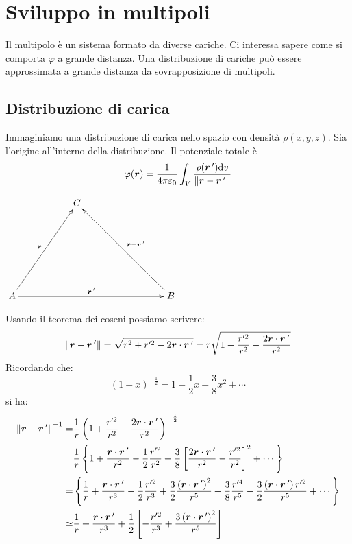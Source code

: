 \section{Sviluppo in multipoli}
Il multipolo è un sistema formato da diverse cariche. Ci interessa sapere come si comporta $\varphi$ a grande distanza. Una distribuzione di cariche può essere approssimata a grande distanza da sovrapposizione di multipoli.
\subsection{Distribuzione di carica}
Immaginiamo una distribuzione di carica nello spazio con densità $\rho(x,y,z)$. Sia l'origine all'interno della distribuzione. Il potenziale totale è 
\begin{equation}
\varphi(\boldsymbol{r})=\frac{1}{4\pi\varepsilon_0}\int_V\frac{\rho(\boldsymbol{r}\,')\mathrm{d} v}{\left\lVert\boldsymbol{r}-\boldsymbol{r}\,'\right\rVert}
\label{multipolo_01}
\end{equation}
\begin{center}
$
\xymatrix{
&&C&&&\\
\\
\\
A\ar[rruuu]^{\ve r}\ar[rrrrr]^{\ve r\,'}&&&&&B\ar[llluuu]_{\ve r-\ve r\,'}
}$\end{center}
Usando il teorema dei coseni possiamo scrivere:
\begin{equation*}\left\lVert\boldsymbol{r}-\boldsymbol{r}\,'\right\rVert=\sqrt{r^2+r'^2-2\boldsymbol{r}\cdot \boldsymbol{r}\,'}=r\sqrt{1+\frac{r'^2}{r^2}-\frac{2\boldsymbol{r}\cdot \boldsymbol{r}\,'}{r^2}}\end{equation*}
Ricordando che:
\begin{equation*}(1+x)^{-\frac{1}{2}}=1-\frac{1}{2}x+\frac{3}{8}x^2+\cdots\end{equation*}
si ha:
\begin{align*}
{\left\lVert\boldsymbol{r}-\boldsymbol{r}\,'\right\rVert}^{-1}=&\frac{1}{r}\left(1+\frac{r'^2}{r^2}-\frac{2\boldsymbol{r}\cdot \boldsymbol{r}\,'}{r^2}\right)^{-\frac{1}{2}}\\
=&\frac{1}{r}\left\{1+\frac{\boldsymbol{r}\cdot\boldsymbol{r}\,'}{r^2}-\frac{1}{2}\frac{r'^2}{r^2}+\frac{3}{8}\left[\frac{2\boldsymbol{r}\cdot\boldsymbol{r}\,'}{r^2}-\frac{r'^2}{r^2}\right]^2+\cdots\right\}\\
=&\left\{\frac{1}{r}+\frac{\boldsymbol{r}\cdot\boldsymbol{r}\,'}{r^3}-\frac{1}{2}\frac{r'^2}{r^3}+\frac{3}{2}\frac{\left(\boldsymbol{r}\cdot\boldsymbol{r}\,'\right)^2}{r^5}+\frac{3}{8}\frac{r'^4}{r^5}-\frac{3}{2}\frac{\left(\boldsymbol{r}\cdot\boldsymbol{r}\, ' \right)r'^2}{r^5}+\cdots\right\}\\
\simeq&\frac{1}{r}+\frac{\boldsymbol{r}\cdot\boldsymbol{r}\,'}{r^3}+\frac{1}{2}\left[-\frac{r'^2}{r^3}+\frac{3\left(\boldsymbol{r}\cdot\boldsymbol{r}\,'\right)^2}{r^5}\right]\\
\end{align*}
